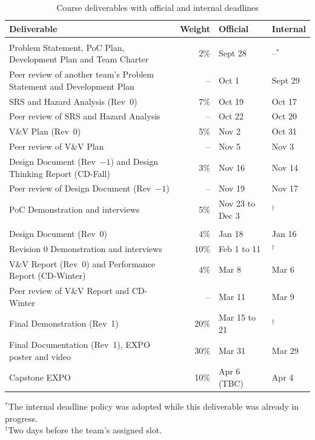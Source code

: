 \documentclass{article}
\begin{document}
\begin{table}[!htbp]
\centering
\caption{Course deliverables with official and internal deadlines}
\label{TblSchedule}
\small
\renewcommand{\arraystretch}{1.2}
\begin{tabularx}{\textwidth}{>{\raggedright\arraybackslash}Xrll}
\toprule
\textbf{Deliverable} & \textbf{Weight} & \textbf{Official} & \textbf{Internal}\\
\midrule
\multicolumn{4}{l}{\textit{Fall term, 2026}}\\
Problem Statement, PoC Plan, Development Plan and Team Charter & 2\% &
  Sept 28 & --$^{*}$\\
Peer review of another team's Problem Statement and Development Plan & -- &
  Oct 1 & Sept 29\\
SRS and Hazard Analysis (Rev~0) & 7\% & Oct 19 & Oct 17\\
Peer review of SRS and Hazard Analysis & -- & Oct 22 & Oct 20\\
V\&V Plan (Rev~0) & 5\% & Nov 2 & Oct 31\\
Peer review of V\&V Plan & -- & Nov 5 & Nov 3\\
Design Document (Rev~$-1$) and Design Thinking Report (CD-Fall) & 3\% &
  Nov 16 & Nov 14\\
Peer review of Design Document (Rev~$-1$) & -- & Nov 19 & Nov 17\\
PoC Demonstration and interviews & 5\% & Nov 23 to Dec 3 & $^{\dagger}$\\
\midrule
\multicolumn{4}{l}{\textit{Winter term, 2027}}\\
Design Document (Rev~0) & 4\% & Jan 18 & Jan 16\\
Revision 0 Demonstration and interviews & 10\% & Feb 1 to 11 &
  $^{\dagger}$\\
V\&V Report (Rev~0) and Performance Report (CD-Winter) & 4\% & Mar 8 &
  Mar 6\\
Peer review of V\&V Report and CD-Winter & -- & Mar 11 & Mar 9\\
Final Demonstration (Rev~1) & 20\% & Mar 15 to 21 & $^{\dagger}$\\
Final Documentation (Rev~1), EXPO poster and video & 30\% & Mar 31 &
  Mar 29\\
Capstone EXPO & 10\% & Apr 6 (TBC) & Apr 4\\
\bottomrule
\end{tabularx}

\vspace{2pt}
\raggedright
{\footnotesize $^{*}$The internal deadline policy was adopted while this
deliverable was already in progress.\\
$^{\dagger}$Two days before the team's assigned slot.}
\end{table}
\end{document}

